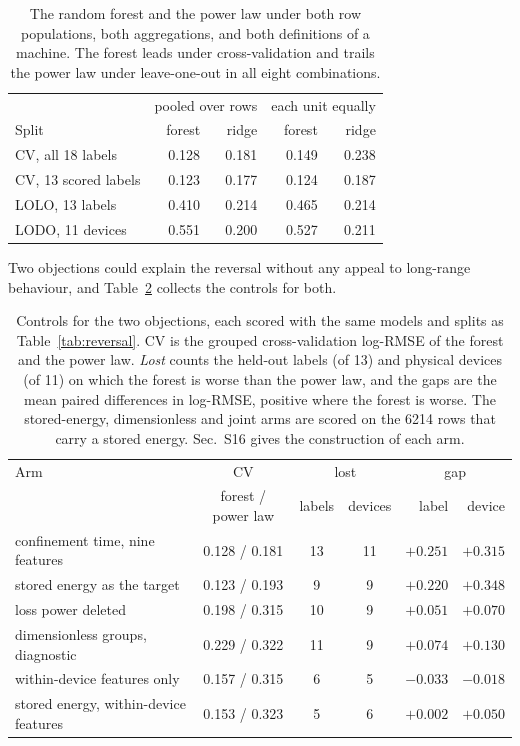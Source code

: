 \documentclass[aip,pop,preprint,amsmath,amssymb]{revtex4-2}
\begin{document}
\begin{table}[t]
\caption{The random forest and the power law under both row populations, both
aggregations, and both definitions of a machine. The forest leads under
cross-validation and trails the power law under leave-one-out in all eight
combinations.}
\label{tab:robustness}
\begin{ruledtabular}
\begin{tabular}{lrrrr}
& \multicolumn{2}{c}{pooled over rows} & \multicolumn{2}{c}{each unit equally} \\
Split & forest & ridge & forest & ridge \\
\hline
CV, all 18 labels          & 0.128 & 0.181 & 0.149 & 0.238 \\
CV, 13 scored labels       & 0.123 & 0.177 & 0.124 & 0.187 \\
LOLO, 13 labels            & 0.410 & 0.214 & 0.465 & 0.214 \\
LODO, 11 devices           & 0.551 & 0.200 & 0.527 & 0.211 \\
\end{tabular}
\end{ruledtabular}
\end{table}

Two objections could explain the reversal without any appeal to long-range
behaviour, and Table~\ref{tab:controls} collects the controls for both.

\begin{table}[t]
\caption{Controls for the two objections, each scored with the same models and
splits as Table~\ref{tab:reversal}. CV is the grouped cross-validation
log-RMSE of the forest and the power law. \emph{Lost} counts the held-out labels
(of 13) and physical devices (of 11) on which the forest is worse than the
power law, and the gaps are the mean paired differences in log-RMSE, positive
where the forest is worse. The stored-energy, dimensionless and joint arms are
scored on the 6214 rows that carry a stored energy. Sec.~S16 gives the
construction of each arm.}
\label{tab:controls}
\begin{ruledtabular}
\begin{tabular}{lcccrr}
Arm & CV & \multicolumn{2}{c}{lost} & \multicolumn{2}{c}{gap} \\
 & forest / power law & labels & devices & label & device \\
\hline
confinement time, nine features & 0.128 / 0.181 & 13 & 11 & $+0.251$ & $+0.315$ \\
stored energy as the target     & 0.123 / 0.193 & 9 & 9 & $+0.220$ & $+0.348$ \\
loss power deleted              & 0.198 / 0.315 & 10 & 9 & $+0.051$ & $+0.070$ \\
dimensionless groups, diagnostic & 0.229 / 0.322 & 11 & 9 & $+0.074$ & $+0.130$ \\
within-device features only     & 0.157 / 0.315 & 6 & 5 & $-0.033$ & $-0.018$ \\
stored energy, within-device features & 0.153 / 0.323 & 5 & 6 & $+0.002$ & $+0.050$ \\
\end{tabular}
\end{ruledtabular}
\end{table}
\end{document}
